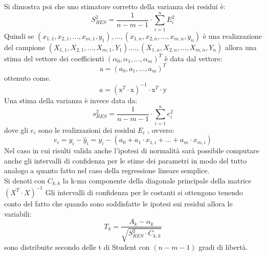 \documentclass[a4paper,12pt, oneside]{book}
\begin{document}
Si dimostra poi che uno stimatore corretto della varianza dei residui è:
\[S_{R E S}^{2}=\frac{1}{n-m-1} \cdot \sum_{i=1}^{n} E_{i}^{2}\]
Quindi se $\left(x_{1,1}, x_{2,1}, \ldots, x_{m, 1}, y_{1}\right), \ldots,\left(x_{1, n}, x_{2, n}, \ldots, x_{m, n}, y_{n}\right)$ è una realizzazione del campione $\left(X_{1,1}, X_{2,1}, \ldots, X_{m, 1}, Y_{1}\right) \ldots .,\left(X_{1, n}, X_{2, n}, \ldots, X_{m, n}, Y_{n}\right)$ allora una stima del vettore dei coefficienti $\left(\alpha_{0}, \alpha_{1}, \ldots, \alpha_{m}\right)^{T}$ è data dal vettore:
\[\mathrm{a}=\left(a_{0}, a_{1}, \ldots, a_{m}\right)^{T}\]
ottenuto come.
\[a=\left(\mathrm{x}^{T} \cdot \mathrm{x}\right)^{-1} \cdot \mathrm{x}^{T} \cdot \mathrm{y}\]
Una stima della varianza è invece data da:
\[s_{R E S}^{2}=\frac{1}{n-m-1} \cdot \sum_{i=1}^{n} e_{i}^{2}\]
dove gli $e_i$ sono le realizzazioni dei residui $E_i$ , ovvero:
\[e_{i}=y_{i}-\hat{y}_{i}=y_{i}-\left(a_{0}+a_{1} \cdot x_{1, i}+\ldots+a_{m} \cdot x_{m, i}\right)\]
Nel caso in cui risulti valida anche l'ipotesi di normalità sarà possibile computare
anche gli intervalli di confidenza per le stime dei parametri in modo del tutto analogo
a quanto fatto nel caso della regressione lineare semplice.\\
Si denoti con $C_{k,k}$ la k-ma componente della diagonale principale della matrice $(X^T\cdot X)^{-1}$ Gli intervalli di confidenza per le costanti si ottengono tenendo conto del fatto che
quando sono soddisfatte le ipotesi sui residui allora le variabili:
\[T_{k}=\frac{A_{k}-\alpha_{k}}{\sqrt{S_{R E S}^{2} \cdot C_{k, k}}}\]
sono distribuite secondo delle t di Student con $(n-m-1)$ gradi di libertà.\\
\end{document}
